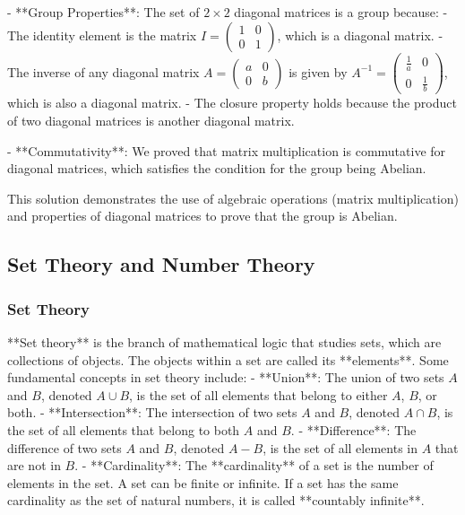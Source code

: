 \documentclass{article}
\begin{document}
- **Group Properties**: The set of \( 2 \times 2 \) diagonal matrices is a group because:
  - The identity element is the matrix \( I = \begin{pmatrix} 1 & 0 \\ 0 & 1 \end{pmatrix} \), which is a diagonal matrix.
  - The inverse of any diagonal matrix \( A = \begin{pmatrix} a & 0 \\ 0 & b \end{pmatrix} \) is given by \( A^{-1} = \begin{pmatrix} \frac{1}{a} & 0 \\ 0 & \frac{1}{b} \end{pmatrix} \), which is also a diagonal matrix.
  - The closure property holds because the product of two diagonal matrices is another diagonal matrix.

- **Commutativity**: We proved that matrix multiplication is commutative for diagonal matrices, which satisfies the condition for the group being Abelian.

This solution demonstrates the use of algebraic operations (matrix multiplication) and properties of diagonal matrices to prove that the group is Abelian. 

\subsection{Set Theory and Number Theory}

\subsubsection*{Set Theory}

**Set theory** is the branch of mathematical logic that studies sets, which are collections of objects. The objects within a set are called its **elements**. Some fundamental concepts in set theory include:
- **Union**: The union of two sets \( A \) and \( B \), denoted \( A \cup B \), is the set of all elements that belong to either \( A \), \( B \), or both.
- **Intersection**: The intersection of two sets \( A \) and \( B \), denoted \( A \cap B \), is the set of all elements that belong to both \( A \) and \( B \).
- **Difference**: The difference of two sets \( A \) and \( B \), denoted \( A - B \), is the set of all elements in \( A \) that are not in \( B \).
- **Cardinality**: The **cardinality** of a set is the number of elements in the set. A set can be finite or infinite. If a set has the same cardinality as the set of natural numbers, it is called **countably infinite**.
\end{document}
